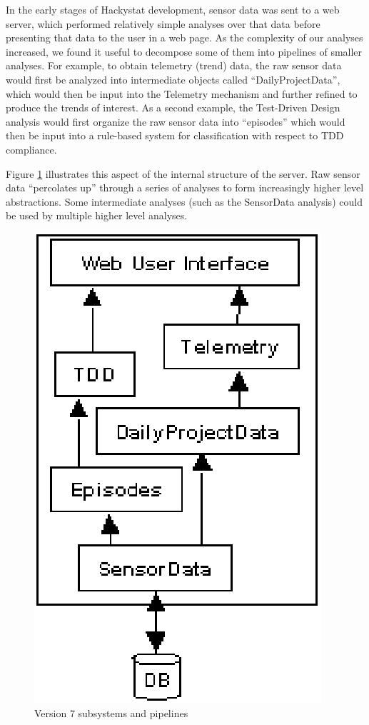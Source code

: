 \documentclass[conference,compsoc]{IEEEtran}
\begin{document}
In the early stages of Hackystat development, sensor data was sent to a web
server, which performed relatively simple analyses over that data before
presenting that data to the user in a web page.  As the complexity of our
analyses increased, we found it useful to decompose some of them into
pipelines of smaller analyses.  For example, to obtain telemetry (trend)
data, the raw sensor data would first be analyzed into intermediate objects
called ``DailyProjectData'', which would then be input into the Telemetry
mechanism and further refined to produce the trends of interest.  As a
second example, the Test-Driven Design analysis would first organize the
raw sensor data into ``episodes'' which would then be input into a
rule-based system for classification with respect to TDD compliance.

Figure \ref{fig:subsystems} illustrates this aspect of the internal structure
of the server.  Raw sensor data ``percolates up'' through a series of analyses
to form increasingly higher level abstractions.  Some intermediate analyses 
(such as the SensorData analysis) could be used by multiple higher level analyses.

\begin{figure}[ht]
  \center
  \includegraphics{subsystems.eps}
  \caption{Version 7 subsystems and pipelines}
  \label{fig:subsystems}
\end{figure} 
\end{document}
